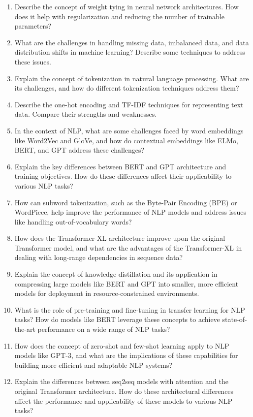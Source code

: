 \documentclass[12pt]{article}
\begin{document}
\begin{enumerate}
  \item Describe the concept of weight tying in neural network architectures. How does it help with regularization and reducing the number of trainable parameters?
  \item What are the challenges in handling missing data, imbalanced data, and data distribution shifts in machine learning? Describe some techniques to address these issues.
  \item Explain the concept of tokenization in natural language processing. What are its challenges, and how do different tokenization techniques address them?
  \item Describe the one-hot encoding and TF-IDF techniques for representing text data. Compare their strengths and weaknesses.
  \item In the context of NLP, what are some challenges faced by word embeddings like Word2Vec and GloVe, and how do contextual embeddings like ELMo, BERT, and GPT address these challenges?
  \item Explain the key differences between BERT and GPT architecture and training objectives. How do these differences affect their applicability to various NLP tasks?
  \item How can subword tokenization, such as the Byte-Pair Encoding (BPE) or WordPiece, help improve the performance of NLP models and address issues like handling out-of-vocabulary words?
  \item How does the Transformer-XL architecture improve upon the original Transformer model, and what are the advantages of the Transformer-XL in dealing with long-range dependencies in sequence data?
  \item Explain the concept of knowledge distillation and its application in compressing large models like BERT and GPT into smaller, more efficient models for deployment in resource-constrained environments.
  \item What is the role of pre-training and fine-tuning in transfer learning for NLP tasks? How do models like BERT leverage these concepts to achieve state-of-the-art performance on a wide range of NLP tasks?
  \item How does the concept of zero-shot and few-shot learning apply to NLP models like GPT-3, and what are the implications of these capabilities for building more efficient and adaptable NLP systems?
  \item Explain the differences between seq2seq models with attention and the original Transformer architecture. How do these architectural differences affect the performance and applicability of these models to various NLP tasks?

\end{enumerate}
\end{document}
